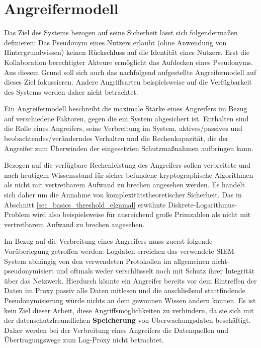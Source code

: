 \section{Angreifermodell}

\label{subsec_impl_requirements_attackermodel}



Das Ziel des Systems bezogen auf seine Sicherheit lässt sich folgendermaßen definieren: Das Pseudonym eines Nutzers erlaubt (ohne Anwendung von Hintergrundwissen) keinen Rückschluss auf die Identität eines Nutzers. Erst die Kollaboration berechtigter Akteure ermöglicht das Aufdecken eines Pseudonyms. Aus diesem Grund soll sich auch das nachfolgend aufgestellte Angreifermodell auf dieses Ziel fokussieren. Andere Angriffsarten beispielsweise auf die Verfügbarkeit des Systems werden daher nicht betrachtet.

Ein Angreifermodell beschreibt die maximale Stärke eines Angreifers im Bezug auf verschiedene Faktoren, gegen die ein System abgesichert ist. Enthalten sind die Rolle eines Angreifers, seine Verbreitung im System, aktives/passives und beobachtendes/veränderndes Verhalten und die Rechenkapazität, die der Angreifer zum Überwinden der eingesetzten Schutzmaßnahmen aufbringen kann. \cite{baumann2014kryptographische} 

Bezogen auf die verfügbare Rechenleistung des Angreifers sollen verbreitete und nach heutigem Wissensstand für sicher befundene kryptographische Algorithmen als nicht mit vertretbarem Aufwand zu brechen angesehen werden. Es handelt sich daher um die Annahme von komplexitätstheoretischer Sicherheit. Das in Abschnitt \ref{sec_basics_threshold_elgamal} erwähnte Diskrete-Logarithmus-Problem wird also beispielsweise für ausreichend große Primzahlen als nicht mit vertretbarem Aufwand zu brechen angesehen.

Im Bezug auf die Verbreitung eines Angreifers muss zuerst folgende Vorüberlegung getroffen werden: 
Logdaten erreichen das verwendete SIEM-System abhängig von den verwendeten Protokollen im allgemeinen nicht-pseudonymisiert und oftmals weder verschlüsselt noch mit Schutz ihrer Integrität über das Netzwerk. Hierdurch könnte ein Angreifer bereits vor dem Eintreffen der Daten im Proxy passiv alle Daten mitlesen und die anschließend stattfindende Pseudonymisierung würde nichts an dem gewonnen Wissen ändern können.
Es ist kein Ziel dieser Arbeit, diese Angriffsmöglichkeiten zu verhindern, da sie sich mit der datenschutzfreundlichen \textbf{Speicherung} von Überwachungsdaten beschäftigt. Daher werden bei der Verbreitung eines Angreifers die Datenquellen und Übertragungswege zum Log-Proxy nicht betrachtet.

